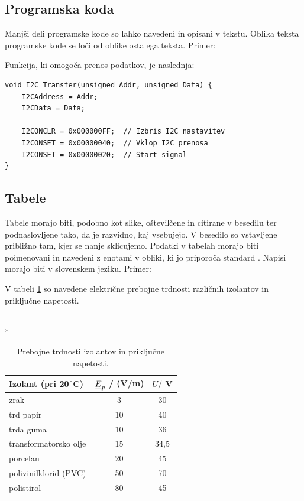 \documentclass[a4paper,twoside,openright,12pt,slovene]{book}
\begin{document}
\subsection{Programska koda}

Manjši deli programske kode so lahko navedeni in opisani v tekstu. Oblika teksta programske kode se loči od oblike ostalega teksta.
Primer:

Funkcija, ki omogoča prenos podatkov, je naslednja:

\lstset{language=C}
\begin{lstlisting}
void I2C_Transfer(unsigned Addr, unsigned Data) {
    I2CAddress = Addr;
    I2CData = Data;

    I2CONCLR = 0x000000FF;  // Izbris I2C nastavitev
    I2CONSET = 0x00000040;  // Vklop I2C prenosa
    I2CONSET = 0x00000020;  // Start signal
}
\end{lstlisting}

\subsection{Tabele} \label{vnos_tabel}

Tabele morajo biti, podobno kot slike, oštevilčene in citirane v besedilu ter podnaslovljene tako, da je razvidno, kaj vsebujejo. V besedilo so vstavljene približno tam, kjer se nanje sklicujemo. Podatki v tabelah morajo biti poimenovani in navedeni z enotami v obliki, ki jo priporoča standard \cite{standard_sist_v, standard_sist_80000}. Napisi morajo biti v slovenskem jeziku. Primer:

V tabeli \ref{prebojne_trdnosti} so navedene električne prebojne trdnosti različnih izolantov in priključne napetosti.

\begin{footnotesize}
\begin{table}[h]
    \centering
    \caption{\label{prebojne_trdnosti} Prebojne trdnosti izolantov in priključne napetosti.}
    ~\\*\begin{tabular}{lcc} \hline
        Izolant (pri 20$\degree$C) & $\emph{E}_p$ / (V/m) & $U /$ V \\ \hline
        zrak                  & 3                    & 30      \\
        trd papir             & 10                   & 40      \\
        trda guma             & 10                   & 36      \\
        transformatorsko olje & 15                   & 34,5    \\
        porcelan              & 20                   & 45      \\
        polivinilklorid (PVC) & 50                   & 70      \\
        polistirol            & 80                   & 45      \\ \hline
    \end{tabular}
\end{table}
\end{footnotesize}
\end{document}
